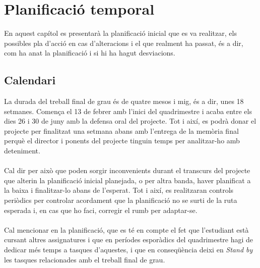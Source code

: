 
\chapter{Planificació temporal} %

\label{Chapter9} %

En aquest capítol es presentarà la planificació inicial que es va realitzar, els possibles pla d'acció en cas d'alteracions i el que realment ha passat, és a dir, com ha anat la planificació i si hi ha hagut desviacions.


\section{Calendari}

La durada del treball final de grau és de quatre mesos i mig, és a dir, unes 18 setmanes. Comença el 13 de febrer amb l'inici del quadrimestre i acaba entre els dies 26 i 30 de juny amb la defensa oral del projecte. Tot i així, es podrà donar el projecte per finalitzat una setmana abans amb l'entrega de la memòria final perquè el director i ponents del projecte tinguin temps per analitzar-ho amb deteniment.
\\\\
Cal dir per això que poden sorgir inconvenients durant el transcurs del projecte que alterin la planificació inicial planejada, o per altra banda, haver planificat a la baixa i finalitzar-lo abans de l'esperat. Tot i així, es realitzaran controls periòdics per controlar acordament que la planificació no se surti de la ruta esperada i, en cas que ho faci, corregir el rumb per adaptar-se.
\\\\
Cal mencionar en la planificació, que es té en compte el fet que l'estudiant està cursant altres assignatures i que en períodes esporàdics del quadrimestre hagi de dedicar més temps a tasques d'aquestes, i que en conseqüència deixi en \textit{Stand by} les tasques relacionades amb el treball final de grau.


